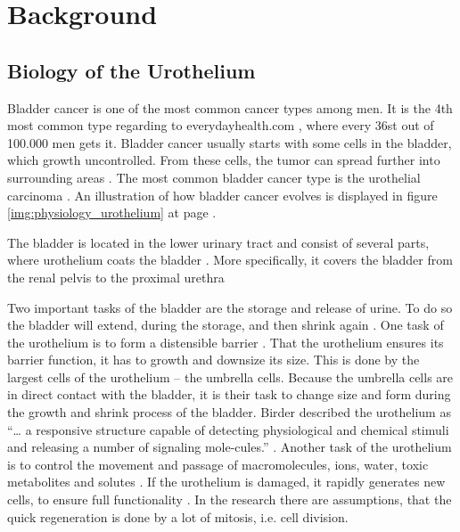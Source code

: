 \section{Background}
\subsection{Biology of the Urothelium}
Bladder cancer is one of the most common cancer types among men. It is the 4th most common type regarding to everydayhealth.com \cite{EveryDayHealth.com}, where every 36st out of 100.000 men gets it. Bladder cancer usually starts with some cells in the bladder, which growth uncontrolled. From these cells, the tumor can spread further into surrounding areas \cite{Cancer.org}. The most common bladder cancer type is the urothelial carcinoma \cite{Cancer.org}. An illustration of how bladder cancer evolves is displayed in figure \ref{img:physiology_urothelium} at page \pageref{img:physiology_urothelium}.

The bladder is located in the lower urinary tract and consist of several parts, where urothelium coats the bladder \cite{Lazzeri2006}. More specifically, it covers the bladder from the renal pelvis to the proximal urethra \cite{Yamany2014, Birder2005} 

Two important tasks of the bladder are the storage and release of urine. To do so the bladder will extend, during the storage, and then shrink again \cite{Karl-ErikAndersson2004}. One task of the urothelium is to form a distensible barrier \cite{Apodaca2004, Lazzeri2006, PuneetKhandelwal2009, WRCross2005}. That the urothelium ensures its barrier function, it has to growth and downsize its size. This is done by the largest cells of the urothelium – the umbrella cells. Because the umbrella cells are in direct contact with the bladder, it is their task to change size and form during the growth and shrink process of the bladder. Birder described the urothelium as “… a responsive structure capable of detecting physiological and chemical stimuli and releasing a number of signaling mole-cules.” \cite{Birder2005}. Another task of the urothelium is to control the movement and passage of macromolecules, ions, water, toxic metabolites and solutes \cite{Apodaca2004, PuneetKhandelwal2009}. If the urothelium is damaged, it rapidly generates new cells, to ensure full functionality \cite{Apodaca2004, Yamany2014, PuneetKhandelwal2009}. In the research there are assumptions, that the quick regeneration is done by a lot of mitosis, i.e. cell division.

